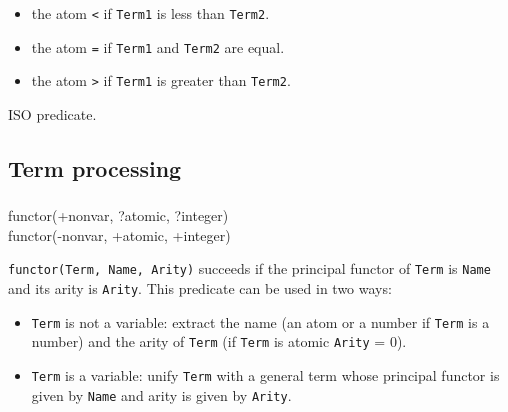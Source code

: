 \begin{itemize}

\item the atom \texttt{<} if \texttt{Term1} is less than \texttt{Term2}.

\item the atom \texttt{=} if \texttt{Term1} and \texttt{Term2} are equal.

\item the atom \texttt{>} if \texttt{Term1} is greater than
\texttt{Term2}.

\end{itemize}

\begin{PlErrors}



\end{PlErrors}

\Portability

ISO predicate.

\subsection{Term processing}

\subsubsection{ \label{functor/3}}

\begin{TemplatesOneCol}
functor(+nonvar, ?atomic, ?integer)\\
functor(-nonvar, +atomic, +integer)

\end{TemplatesOneCol}

\Description

\texttt{functor(Term, Name, Arity)} succeeds if the principal functor of
\texttt{Term} is \texttt{Name} and its arity is \texttt{Arity}. This
predicate can be used in two ways:

\begin{itemize}

\item \texttt{Term} is not a variable: extract the name (an atom or a number
if \texttt{Term} is a number) and the arity of \texttt{Term} (if
\texttt{Term} is atomic \texttt{Arity} = 0).

\item \texttt{Term} is a variable: unify \texttt{Term} with a general term
whose principal functor is given by \texttt{Name} and arity is given by
\texttt{Arity}.

\end{itemize}


